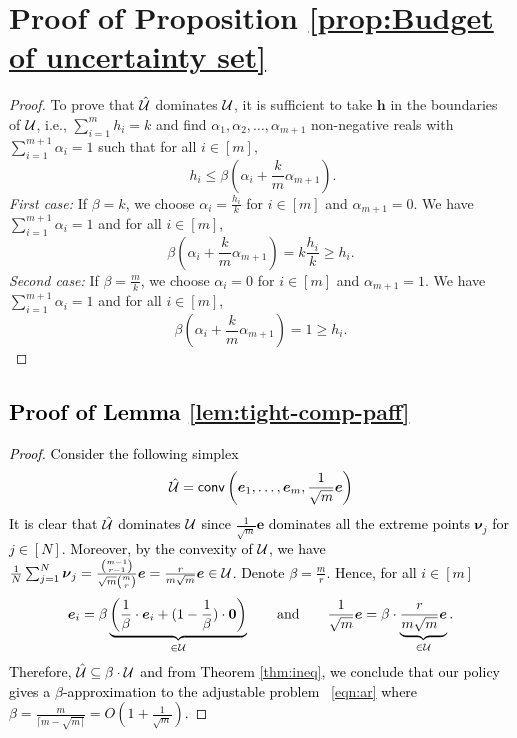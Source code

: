 \documentclass[11pt]{article}
\theoremstyle{plain}
\theoremstyle{definition}
\numberwithin{equation}{section}%
\numberwithin{equation}{section}%
\newcommand{\mb}[1]{\ensuremath{\boldsymbol{#1}}}
\newcommand*{\red}{\textcolor{black}}
\begin{document}
\begin{appendix}
\section{Proof of Proposition \ref{prop:Budget of uncertainty set}}\label{apx-proofs:prop:Budget of uncertainty set}

\begin{proof}
To prove that $\hat{ \cal U}$ dominates ${ \cal U}$, it is sufficient to take $\mb h$ in the boundaries of $ {\cal U}$, i.e.,  $\sum_{i=1}^m h_i =k$ and find $ \alpha_1, \alpha_2,\ldots,\alpha_{m+1}$ non-negative reals with $\sum_{i=1}^{m+1} \alpha_i =1$ such that for all $ i \in [m],$ $$ \; h_i \leq \beta \left( \alpha_i + \frac{k}{m}\alpha_{m+1}\right).$$
{\em{First case:}} If $\beta=k$, we choose  $\alpha_i = \frac{h_i}{k}$ for $ i \in [m]$ and $\alpha_{m+1}= 0.$ We have $\sum_{i=1}^{m+1} \alpha_i =1$ and for all $ i \in [m]$,
$$ \beta \left( \alpha_i + \frac{k}{m}\alpha_{m+1}\right) =  k \frac{h_i}{k} \geq h_i .$$
{\em{Second case:}} If $\beta=\frac{m}{k}$, we choose  $\alpha_i = 0 $ for $ i \in [m]$ and $\alpha_{m+1}= 1.$ We have $\sum_{i=1}^{m+1} \alpha_i =1$ and for all $ i \in [m]$,
$$ \beta \left( \alpha_i + \frac{k}{m}\alpha_{m+1}\right) =  1 \geq h_i .$$
 \end{proof}
\red{
\section{Proof of Lemma \ref{lem:tight-comp-paff}}\label{apx-proofs:lem:tight-comp-paff}
\begin{proof}
Consider the following simplex
$$ \hat{\cal U} = {\sf{conv}} \left(\mb e_1 , \ldots ,\mb e_m, \frac{1}{\sqrt{m}} \mb e        \right)$$
It is clear that $ \hat{\cal U}$ dominates  ${\cal U}$ since $\frac{1}{\sqrt{m}} \mb e$ dominates all the extreme points $ \mb \nu_j$ for $j \in [N]$.
Moreover, by the convexity of $ \cal U$,  we have $ \frac{1}{N} \sum_{j=1}^N \mb {\nu}_j = \frac{\binom {m-1} {r-1}}{\sqrt{m}\binom m r}   \mb e = \frac{r}{m\sqrt{m}} \mb e \in {\cal U}$. Denote $\beta = \frac{m}{r } $. Hence, for all $i \in [m]$
$$ \mb e_i = \beta  \underbrace{\left( \frac{1}{\beta} \cdot \mb e_i + (1- \frac{1}{\beta}) \cdot \mb 0\right) }_{\in {\cal U}} \qquad \text{and} \qquad \frac{1}{\sqrt{m}} \mb e = \beta \cdot  \underbrace{\frac{r}{m\sqrt{m}} \mb e}_{\in \cal U}. $$
Therefore, $ \hat{\cal U} \subseteq \beta \cdot {\cal U}$ and from Theorem \ref{thm:ineq}, we conclude that our policy gives a $\beta$-approximation to the adjustable problem ~\eqref{eqn:ar} where $\beta = \frac{m}{\lceil m- \sqrt{m \rceil}  }=O (1+ \frac{1}{\sqrt{m}})$.
 \end{proof}
}
\end{appendix}
\end{document}
